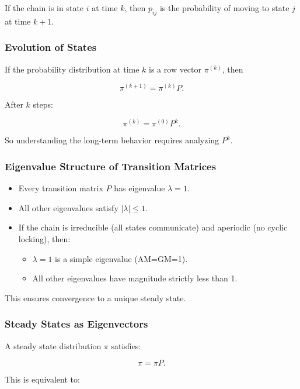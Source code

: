 \documentclass[
  letterpaper,
  DIV=11,
  numbers=noendperiod]{scrreprt}
\providecommand{\tightlist}{%
  \setlength{\itemsep}{0pt}\setlength{\parskip}{0pt}}
\begin{document}
If the chain is in state \(i\) at time \(k\), then \(p_{ij}\) is the
probability of moving to state \(j\) at time \(k+1\).

\subsubsection{Evolution of States}\label{evolution-of-states}

If the probability distribution at time \(k\) is a row vector
\(\pi^{(k)}\), then

\[
\pi^{(k+1)} = \pi^{(k)} P.
\]

After \(k\) steps:

\[
\pi^{(k)} = \pi^{(0)} P^k.
\]

So understanding the long-term behavior requires analyzing \(P^k\).

\subsubsection{Eigenvalue Structure of Transition
Matrices}\label{eigenvalue-structure-of-transition-matrices}

\begin{itemize}
\item
  Every transition matrix \(P\) has eigenvalue \(\lambda = 1\).
\item
  All other eigenvalues satisfy \(|\lambda| \leq 1\).
\item
  If the chain is irreducible (all states communicate) and aperiodic (no
  cyclic locking), then:

  \begin{itemize}
  \tightlist
  \item
    \(\lambda=1\) is a simple eigenvalue (AM=GM=1).
  \item
    All other eigenvalues have magnitude strictly less than 1.
  \end{itemize}
\end{itemize}

This ensures convergence to a unique steady state.

\subsubsection{Steady States as
Eigenvectors}\label{steady-states-as-eigenvectors}

A steady state distribution \(\pi\) satisfies:

\[
\pi = \pi P.
\]

This is equivalent to:
\end{document}
